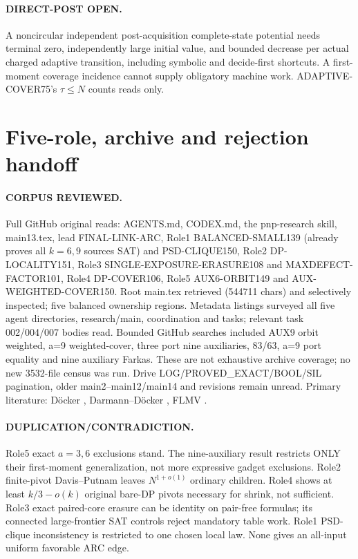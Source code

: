 \documentclass[11pt]{article}
\begin{document}
\paragraph{DIRECT-POST OPEN.} A noncircular independent post-acquisition complete-state potential needs terminal zero, independently large initial value, and bounded decrease per actual charged adaptive transition, including symbolic and decide-first shortcuts. A first-moment coverage incidence cannot supply obligatory machine work. ADAPTIVE-COVER75's $\tau\le N$ counts reads only.
\section{Five-role, archive and rejection handoff}
\paragraph{CORPUS REVIEWED.} Full GitHub original reads: AGENTS.md, CODEX.md, the pnp-research skill, main13.tex, lead FINAL-LINK-ARC, Role1 BALANCED-SMALL139 (already proves all $k=6,9$ sources SAT) and PSD-CLIQUE150, Role2 DP-LOCALITY151, Role3 SINGLE-EXPOSURE-ERASURE108 and MAXDEFECT-FACTOR101, Role4 DP-COVER106, Role5 AUX6-ORBIT149 and AUX-WEIGHTED-COVER150. Root main.tex retrieved (544711 chars) and selectively inspected; five balanced ownership regions. Metadata listings surveyed all five agent directories, research/main, coordination and tasks; relevant task 002/004/007 bodies read. Bounded GitHub searches included AUX9 orbit weighted, a=9 weighted-cover, three port nine auxiliaries, 83/63, a=9 port equality and nine auxiliary Farkas. These are not exhaustive archive coverage; no new 3532-file census was run. Drive LOG/PROVED\_EXACT/BOOL/SIL pagination, older main2--main12/main14 and revisions remain unread. Primary literature: D\"ocker \cite{docker}, Darmann--D\"ocker \cite{dd}, FLMV \cite{flmv}.
\paragraph{DUPLICATION/CONTRADICTION.} Role5 exact $a=3,6$ exclusions stand. The nine-auxiliary result restricts ONLY their first-moment generalization, not more expressive gadget exclusions. Role2 finite-pivot Davis--Putnam leaves $N^{1+o(1)}$ ordinary children. Role4 shows at least $k/3-o(k)$ original bare-DP pivots necessary for shrink, not sufficient. Role3 exact paired-core erasure can be identity on pair-free formulas; its connected large-frontier SAT controls reject mandatory table work. Role1 PSD-clique inconsistency is restricted to one chosen local law. None gives an all-input uniform favorable ARC edge.
\end{document}
